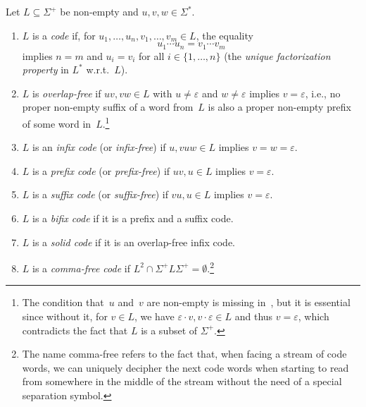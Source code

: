 \begin{definition} \label{constrsync:def:codes}
	Let $L \subseteq \Sigma^+$ be non-empty and $u,v,w \in \Sigma^*$.
	
	\begin{enumerate}%
		\item \label{constrsync:item:code} $L$ is a \emph{code} if, for $u_1, \ldots, u_n, v_1, \ldots, v_m \in L$,
		the equality
		\[
		u_1 \cdots u_n = v_1 \cdots v_m
		\]
		implies $n = m$ and $u_i = v_i$ for all $i \in \{1,\ldots,n\}$ (the \emph{unique factorization property} in $L^*$ w.r.t.~$L$).
		
		\item  $L$ is \emph{overlap-free}		
		if $uv, vw \in L$ with $u \ne\varepsilon$ and  $w \ne \varepsilon$ implies $v = \varepsilon$, i.e., no proper non-empty suffix
		of a word from~$L$ is also a proper non-empty prefix of some word in~$L$.\footnote{The condition
			that~$u$ and~$v$ are non-empty is missing in~\cite{DBLP:journals/tcs/JurgensenS21},
			but it is essential since without it,
			for $v \in L$, we have $\varepsilon\cdot v, v \cdot \varepsilon \in L$
			and thus $v = \varepsilon$, which
			contradicts the fact that $L$ is a subset of $\Sigma^+$.}		
		
		
		\item $L$ is an \emph{infix code} (or \emph{infix-free}) if $u, vuw \in L$ implies $v = w = \varepsilon$.
		
		\item $L$ is a \emph{prefix code} (or \emph{prefix-free}) if $uv, u \in L$ implies $v = \varepsilon$.
		
		\item $L$ is a \emph{suffix code} (or \emph{suffix-free}) if $vu, u \in L$ implies $v = \varepsilon$.
		
		\item $L$ is a \emph{bifix code} if it is a prefix and a suffix code. 
		
		\item $L$ is a \emph{solid code} if it is an overlap-free infix code.
		
		\item $L$ is a \emph{comma-free code} if $L^2 \cap \Sigma^+ L \Sigma^+ = \emptyset$.\footnote{The name comma-free refers to the fact that, when facing a stream of code words,
			we can uniquely decipher the next code words when 
			starting to read from somewhere in the middle of the stream
			without the need of a special separation symbol.}
	\end{enumerate}
\end{definition}

